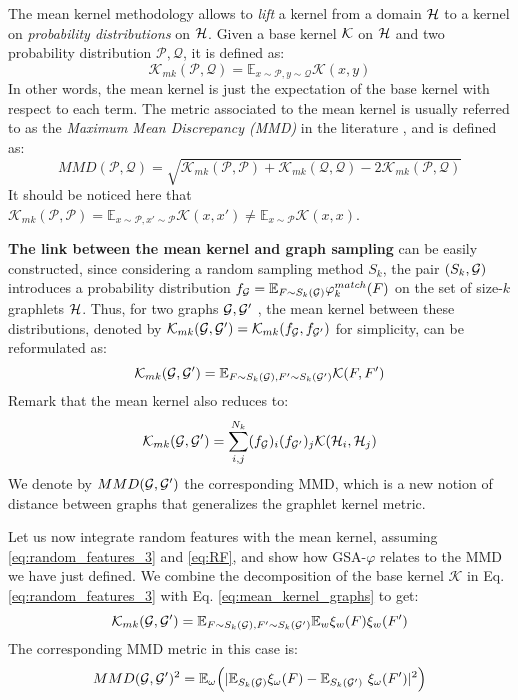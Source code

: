 The mean kernel methodology allows to \emph{lift} a kernel from a domain $\mathcal{H}$ to a kernel on \emph{probability distributions} on $\mathcal{H}$. Given a base kernel $\mathcal{K}$ on $\mathcal{H}$ and two probability distribution $\mathcal{P},\mathcal{Q}$, it is defined as:
\begin{equation}
\label{eq:mean_kernel}
\mathcal{K}_{mk}(\mathcal{P},\mathcal{Q}) = \mathbb{E}_{x \sim \mathcal{P}, y \sim \mathcal{Q}} \mathcal{K}(x,y)
\end{equation}
In other words, the mean kernel is just the expectation of the base kernel with respect to each term. The metric associated to the mean kernel is usually referred to as the \emph{Maximum Mean Discrepancy (MMD)} in the literature \citep{gretton}, and is defined as:
\begin{equation}\label{eq:MMD}
MMD(\mathcal{P},\mathcal{Q}) = \sqrt{\mathcal{K}_{mk}(\mathcal{P},\mathcal{P}) + \mathcal{K}_{mk}(\mathcal{Q},\mathcal{Q}) - 2\mathcal{K}_{mk}(\mathcal{P},\mathcal{Q})}
\end{equation}
It should be noticed here that $\mathcal{K}_{mk}(\mathcal{P},\mathcal{P}) = \mathbb{E}_{x \sim \mathcal{P}, x' \sim \mathcal{P}} \mathcal{K}(x,x') \neq \mathbb{E}_{x \sim \mathcal{P}} \mathcal{K}(x,x)$.

\textbf{The link between the mean kernel and graph sampling} can be easily constructed, since considering a random sampling method $S_k$, the pair $(S_k , \mathcal{G})$  introduces a probability distribution $f_{\mathcal{G}}= \mathbb{E}_{F \sim S_k(\mathcal{G})} \varphi^{match}_k(F)$ on the set of size-$k$ graphlets $\mathcal{H}$. Thus, for two graphs $\mathcal{G},\mathcal{G}'$ , the mean kernel between these distributions, denoted by $\mathcal{K}_{mk}(\mathcal{G},\mathcal{G}')=\mathcal{K}_{mk}(f_{\mathcal{G}},f_{\mathcal{G}'})$ for simplicity, can be reformulated as:
\begin{equation}
\label{eq:mean_kernel_graphs}
\mathcal{K}_{mk}(\mathcal{G},\mathcal{G}') = \mathbb{E}_{F \sim S_k(\mathcal{G}), F' \sim S_k(\mathcal{G}')} \mathcal{K}(F,F')
\end{equation}
Remark that the mean kernel also reduces to:
\[
\mathcal{K}_{mk}(\mathcal{G},\mathcal{G}')=\sum_{i,j}^{N_k}(f_{\mathcal{G}})_i(f_{\mathcal{G}'})_j\mathcal{K}(\mathcal{H}_i,\mathcal{H}_j) 
\]
We denote by $MMD(\mathcal{G},\mathcal{G}')$ the corresponding MMD, which is a new notion of distance between graphs that generalizes the graphlet kernel metric.

Let us now integrate random features with the mean kernel, assuming \eqref{eq:random_features_3} and \eqref{eq:RF}, and show how GSA-$\varphi$ relates to the MMD we have just defined. We combine the decomposition of the base kernel $\mathcal{K}$ in Eq. \eqref{eq:random_features_3} with Eq. \eqref{eq:mean_kernel_graphs} to get:
\begin{equation}
    \label{eq:mk_rf}
    \mathcal{K}_{mk}(\mathcal{G},\mathcal{G}')= \mathbb{E}_{F \sim S_k(\mathcal{G}), F' \sim S_k(\mathcal{G}')} \mathbb{E}_w \xi_w(F)\xi_w(F')
\end{equation}
The corresponding MMD metric in this case is:
\begin{equation}
\label{eq:MMD-RF}
MMD(\mathcal{G},\mathcal{G}')^2 = \mathbb{E}_{\omega} \Big( | \mathbb{E}_{S_k(\mathcal{G})} \xi_\omega(F) - \mathbb{E}_{S_k(\mathcal{G}')} \
\xi_\omega(F') |^2 \Big)
\end{equation}

